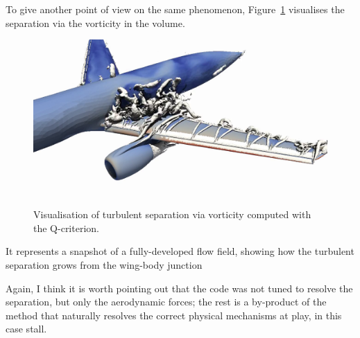 To give another point of view on the same phenomenon, Figure~\ref{fig_hlpw_pylon_22_56_vorticity} visualises the separation via the vorticity in the volume.\begin{figure}
  \centering
    \includegraphics[width=\columnwidth]{img/hlpw/pylon_22_56_vorticity}
    \caption{Visualisation of turbulent separation via vorticity computed with the Q-criterion.}
    \label{fig_hlpw_pylon_22_56_vorticity}
\end{figure}
It represents a snapshot of a fully-developed flow field, showing how the turbulent separation grows from the wing-body junction

Again, I think it is worth pointing out that the code was not tuned to resolve the separation, but only the aerodynamic forces; the rest is a by-product of the method that naturally resolves the correct physical mechanisms at play, in this case stall.

